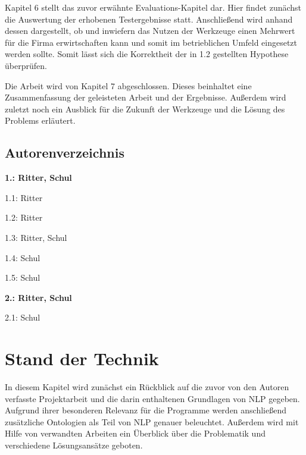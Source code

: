 \documentclass[12pt]{report}
\begin{document}
Kapitel 6 stellt das zuvor erwähnte Evaluations-Kapitel dar. Hier findet zunächst die Auswertung der erhobenen Testergebnisse statt.
Anschließend wird anhand dessen dargestellt, ob und inwiefern das Nutzen der Werkzeuge einen Mehrwert für die Firma erwirtschaften kann und somit im betrieblichen Umfeld eingesetzt werden sollte.  
Somit lässt sich die Korrektheit der in 1.2 gestellten Hypothese überprüfen.

Die Arbeit wird von Kapitel 7 abgeschlossen. Dieses beinhaltet eine Zusammenfassung der geleisteten Arbeit und der Ergebnisse. Außerdem wird zuletzt noch ein Ausblick für die Zukunft der Werkzeuge und die Lösung des Problems erläutert. 

\section{Autorenverzeichnis}
\begin{multicols}{2}
\begin{compactitem}
\item[] \textbf{1.: Ritter, Schul}

\begin{compactitem}
\item[] 1.1: Ritter
\item[] 1.2: Ritter
\item[] 1.3: Ritter, Schul
\item[] 1.4: Schul
\item[] 1.5: Schul
\end{compactitem}

\item[] \textbf{2.: Ritter, Schul}
\begin{compactitem}
\item[] 2.1: Schul
\end{compactitem}

\end{compactitem}
\end{multicols}

\chapter{Stand der Technik}
In diesem Kapitel wird zunächst ein Rückblick auf die zuvor von den Autoren verfasste Projektarbeit und die darin enthaltenen Grundlagen von NLP gegeben. 
Aufgrund ihrer besonderen Relevanz für die Programme werden anschließend zusätzliche Ontologien als Teil von NLP genauer beleuchtet. 
Außerdem wird mit Hilfe von verwandten Arbeiten ein Überblick über die Problematik und verschiedene Lösungsansätze geboten. 
\end{document}
